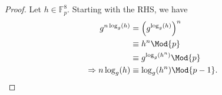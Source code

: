 \documentclass[
  coursecode={MTHE 418},
  assignmentname={Homework \homeworknumber},
  studentnumber=20053722,
  name={Bryan Hoang},
  draft,
  final,
]{
  ltxanswer%
}
\begin{document}
\begin{questions}
\begin{parts}
      \part{}
      \begin{solution}
        \begin{proof}
          Let \(h\in\mathbb{F}_{p}^{8}\). Starting with the RHS, we have
          \begin{align*}
            g^{n\log_{g}(h)}             &= \Bigl(g^{\log_{g}(h)}\Bigr)^{n}  \\
                                         &\equiv h^{n} \Mod{p}               \\
                                         &\equiv g^{\log_{g}(h^{n})} \Mod{p} \\
            \Rightarrow     n\log_{g}(h) &\equiv \log_{g}(h^{n}) \Mod{p-1}.
          \end{align*}
        \end{proof}
      \end{solution}
    \end{parts}
  \end{questions}
\end{document}
